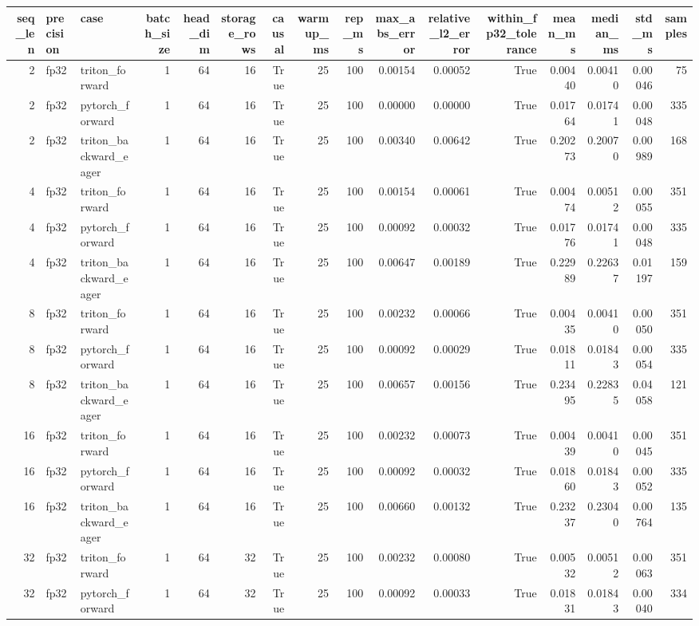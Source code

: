 \begin{tabular}{rllrrrrrrrrrrrrr}
\toprule
seq\_len & precision & case & batch\_size & head\_dim & storage\_rows & causal & warmup\_ms & rep\_ms & max\_abs\_error & relative\_l2\_error & within\_fp32\_tolerance & mean\_ms & median\_ms & std\_ms & samples \\
\midrule
2 & fp32 & triton\_forward & 1 & 64 & 16 & True & 25 & 100 & 0.00154 & 0.00052 & True & 0.00440 & 0.00410 & 0.00046 & 75 \\
2 & fp32 & pytorch\_forward & 1 & 64 & 16 & True & 25 & 100 & 0.00000 & 0.00000 & True & 0.01764 & 0.01741 & 0.00048 & 335 \\
2 & fp32 & triton\_backward\_eager & 1 & 64 & 16 & True & 25 & 100 & 0.00340 & 0.00642 & True & 0.20273 & 0.20070 & 0.00989 & 168 \\
4 & fp32 & triton\_forward & 1 & 64 & 16 & True & 25 & 100 & 0.00154 & 0.00061 & True & 0.00474 & 0.00512 & 0.00055 & 351 \\
4 & fp32 & pytorch\_forward & 1 & 64 & 16 & True & 25 & 100 & 0.00092 & 0.00032 & True & 0.01776 & 0.01741 & 0.00048 & 335 \\
4 & fp32 & triton\_backward\_eager & 1 & 64 & 16 & True & 25 & 100 & 0.00647 & 0.00189 & True & 0.22989 & 0.22637 & 0.01197 & 159 \\
8 & fp32 & triton\_forward & 1 & 64 & 16 & True & 25 & 100 & 0.00232 & 0.00066 & True & 0.00435 & 0.00410 & 0.00050 & 351 \\
8 & fp32 & pytorch\_forward & 1 & 64 & 16 & True & 25 & 100 & 0.00092 & 0.00029 & True & 0.01811 & 0.01843 & 0.00054 & 335 \\
8 & fp32 & triton\_backward\_eager & 1 & 64 & 16 & True & 25 & 100 & 0.00657 & 0.00156 & True & 0.23495 & 0.22835 & 0.04058 & 121 \\
16 & fp32 & triton\_forward & 1 & 64 & 16 & True & 25 & 100 & 0.00232 & 0.00073 & True & 0.00439 & 0.00410 & 0.00045 & 351 \\
16 & fp32 & pytorch\_forward & 1 & 64 & 16 & True & 25 & 100 & 0.00092 & 0.00032 & True & 0.01860 & 0.01843 & 0.00052 & 335 \\
16 & fp32 & triton\_backward\_eager & 1 & 64 & 16 & True & 25 & 100 & 0.00660 & 0.00132 & True & 0.23237 & 0.23040 & 0.00764 & 135 \\
32 & fp32 & triton\_forward & 1 & 64 & 32 & True & 25 & 100 & 0.00232 & 0.00080 & True & 0.00532 & 0.00512 & 0.00063 & 351 \\
32 & fp32 & pytorch\_forward & 1 & 64 & 32 & True & 25 & 100 & 0.00092 & 0.00033 & True & 0.01831 & 0.01843 & 0.00040 & 334 \\

\end{tabular}
